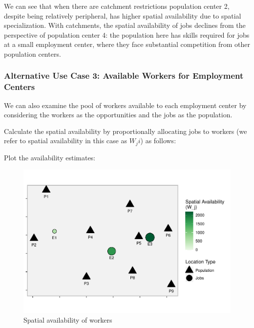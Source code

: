 \documentclass[]{elsarticle} %
\begin{document}
We can see that when there are catchment restrictions population center
2, despite being relatively peripheral, has higher spatial availability
due to spatial specialization. With catchments, the spatial availability
of jobs declines from the perspective of population center 4: the
population here has skills required for jobs at a small employment
center, where they face substantial competition from other population
centers.

\hypertarget{alternative-use-case-3-available-workers-for-employment-centers}{%
\subsubsection{Alternative Use Case 3: Available Workers for Employment
Centers}\label{alternative-use-case-3-available-workers-for-employment-centers}}

We can also examine the pool of workers available to each employment
center by considering the workers as the opportunities and the jobs as
the population.

Calculate the spatial availability by proportionally allocating jobs to
workers (we refer to spatial availability in this case as \(W_ji\)) as
follows:

Plot the availability estimates:

\begin{figure}
\includegraphics[width=1\linewidth]{Spatial-Availability_files/figure-latex/toy-example-availability-workers-1} \caption{\label{fig:toy-example-availability-workers}Spatial availability of workers}\label{fig:toy-example-availability-workers}
\end{figure}
\end{document}

